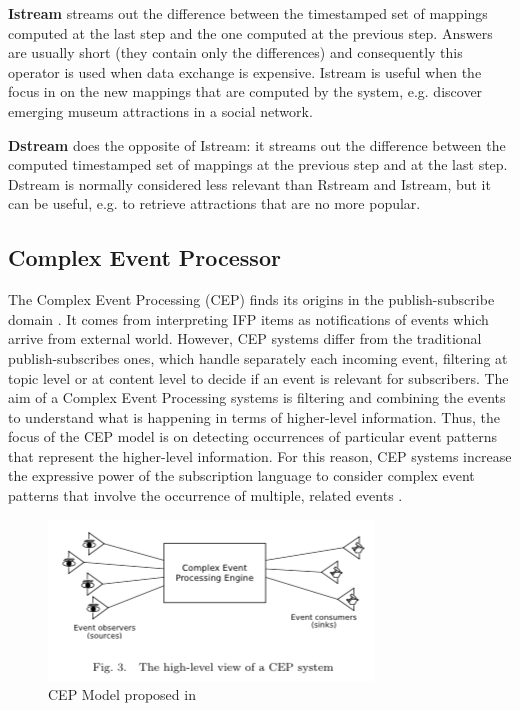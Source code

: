\textbf{Istream} streams out the difference between the timestamped set of mappings computed at the last step and the one computed at the previous step. Answers are usually short (they contain only the differences) and consequently this operator is used when data exchange is expensive. Istream is useful when the focus in on the new mappings that are computed by the system, e.g. discover emerging museum attractions in a social network.

\textbf{Dstream} does the opposite of Istream: it streams out the difference between the computed timestamped set of mappings at the previous step and at the last step. Dstream is normally considered less relevant than Rstream and Istream, but it can be useful, e.g. to retrieve attractions that are no more popular.


\subsection{Complex Event Processor}\label{sec:cep}

The Complex Event Processing (CEP)  finds its origins in the publish-subscribe domain \cite{Eugster:2003:MFP:857076.857078}. It comes from interpreting IFP items as notifications of events which arrive from  external world.  However, CEP systems differ from the traditional publish-subscribes ones, which handle separately each incoming event, filtering at topic level or at content level to decide if an event is relevant for subscribers. The aim of a Complex Event Processing systems is filtering and combining the events to understand what is happening in terms of higher-level information. Thus, the focus of the CEP model is on detecting occurrences of particular event patterns that represent the higher-level information. For this reason, CEP systems increase the expressive power of the subscription language to consider complex event patterns that involve the occurrence of multiple, related events \cite{Cugola:2012:PFI:2187671.2187677}.

\begin{figure}[tbh]
  \centering
	\includegraphics[width=0.75\linewidth]{images/cep}
	\caption{CEP Model proposed in \cite{Cugola:2012:PFI:2187671.2187677}  } 
  	\label{fig:cep}
\end{figure}

